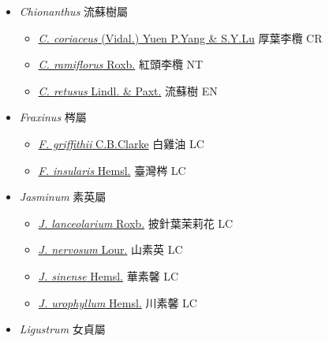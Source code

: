 
  \begin{itemize}
 \item[] \textit{Chionanthus} 流蘇樹屬
                                
  \begin{itemize}
        \item[] \href{http://www.theplantlist.org/tpl1.1/search?q=Chionanthus+coriaceus}{\textit{C. coriaceus} (Vidal.) Yuen P.Yang \& S.Y.Lu}   厚葉李欖   CR
        \item[] \href{http://www.theplantlist.org/tpl1.1/search?q=Chionanthus+ramiflorus}{\textit{C. ramiflorus} Roxb.}   紅頭李欖   NT
        \item[] \href{http://www.theplantlist.org/tpl1.1/search?q=Chionanthus+retusus}{\textit{C. retusus} Lindl. \& Paxt.}   流蘇樹   EN
  \end{itemize}
 \item[] \textit{Fraxinus} 梣屬
                                
  \begin{itemize}
        \item[] \href{http://www.theplantlist.org/tpl1.1/search?q=Fraxinus+griffithii}{\textit{F. griffithii} C.B.Clarke}   白雞油   LC
        \item[] \href{http://www.theplantlist.org/tpl1.1/search?q=Fraxinus+insularis}{\textit{F. insularis} Hemsl.}   臺灣梣   LC
  \end{itemize}
 \item[] \textit{Jasminum} 素英屬
                                
  \begin{itemize}
        \item[] \href{http://www.theplantlist.org/tpl1.1/search?q=Jasminum+lanceolarium}{\textit{J. lanceolarium} Roxb.}   披針葉茉莉花   LC
        \item[] \href{http://www.theplantlist.org/tpl1.1/search?q=Jasminum+nervosum}{\textit{J. nervosum} Lour.}   山素英   LC
        \item[] \href{http://www.theplantlist.org/tpl1.1/search?q=Jasminum+sinense}{\textit{J. sinense} Hemsl.}   華素馨   LC
        \item[] \href{http://www.theplantlist.org/tpl1.1/search?q=Jasminum+urophyllum}{\textit{J. urophyllum} Hemsl.}   川素馨   LC
  \end{itemize}
 \item[] \textit{Ligustrum} 女貞屬
                                

\end{itemize}
